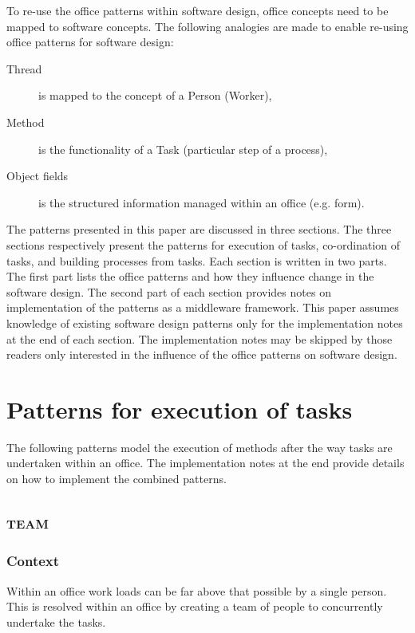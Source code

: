 \documentclass[prodmode]{style/acmlarge}
\begin{document}
To re-use the office patterns within software design, office concepts need to be
mapped to software concepts.  The following analogies are made to enable
re-using office patterns for software design:
\begin{description}
  \item[Thread] is mapped to the concept of a Person (Worker),
  \item[Method] is the functionality of a Task (particular step of a process),
  \item[Object fields] is the structured information managed within an office (e.g. form).
\end{description}

The patterns presented in this paper are discussed in three sections.  The three
sections respectively present the patterns for execution of tasks, co-ordination
of tasks, and building processes from tasks.  Each section is written in two
parts.  The first part lists the office patterns and how they influence change
in the software design.  The second part of each section provides notes on
implementation of the patterns as a middleware framework.  This paper assumes
knowledge of existing software design patterns only for the implementation notes
at the end of each section.  The implementation notes may be skipped by those
readers only interested in the influence of the office patterns on software
design.



\section{Patterns for execution of tasks}

The following patterns model the execution of methods after the way tasks are
undertaken within an office.  The implementation notes at the end provide
details on how to implement the combined patterns.


\subsection{\textsc{\textbf{team}}}

\subsubsection*{Context} Within an office work loads can be far above that
possible by a single person. This is resolved within an office by creating a
team of people to concurrently undertake the tasks.
\end{document}
